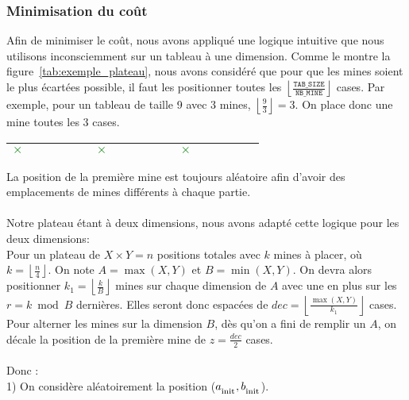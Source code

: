 \subsubsection*{Minimisation du coût}
Afin de minimiser le coût, nous avons appliqué une logique intuitive que nous utilisons inconsciemment sur un tableau à une dimension. Comme le montre la figure~\ref{tab:exemple_plateau}, nous avons considéré que pour que les mines soient le plus écartées possible, il faut les positionner toutes les \(\left\lfloor \frac{\texttt{TAB\_SIZE}}{\texttt{NB\_MINE}} \right\rfloor\) cases. Par exemple, pour un tableau de taille 9 avec 3 mines, \(\left\lfloor \frac{9}{3} \right\rfloor = 3\). On place donc une mine toutes les 3 cases.
\begin{center}
\begin{tabular}{|p{0.07\linewidth}|p{0.07\linewidth}|p{0.07\linewidth}|p{0.07\linewidth}|p{0.07\linewidth}|p{0.07\linewidth}|p{0.07\linewidth}|p{0.07\linewidth}|p{0.07\linewidth}|}
\hline
\centering\textbf{\textcolor{green}{\huge $\times$}} & & & \centering\textbf{\textcolor{green}{\huge $\times$}} &  &  & \centering\textbf{\textcolor{green}{\huge $\times$}} &  &\\
\hline
\end{tabular}
\label{tab:exemple_plateau}
\end{center}
La position de la première mine est toujours aléatoire afin d'avoir des emplacements de mines différents à chaque partie.\\ \\
Notre plateau étant à deux dimensions, nous avons adapté cette logique pour les deux dimensions:\\
Pour un plateau de \(X \times Y = n\) positions totales avec \(k\) mines à placer, où \(k = \left\lfloor \frac{n}{4} \right\rfloor\). On note \(A = \max(X, Y)\) et \(B = \min(X, Y)\). On devra alors positionner \(k_1 = \left\lfloor\frac{k}{B}\right\rfloor\) mines sur chaque dimension de \(A\) avec une en plus sur les \(r = k\bmod B\) dernières. Elles seront donc espacées de \(dec = \left\lfloor \frac{\max(X, Y)}{k_1} \right\rfloor\) cases. Pour alterner les mines sur la dimension \(B\), dès qu'on a fini de remplir un \(A\), on décale la position de la première mine de \(z = \frac{dec}{2}\) cases.\\
\\ Donc :
\\
1) On considère aléatoirement la position (\(a_{\textsubscript{init}}, b_{\textsubscript{init}}\)). \\
